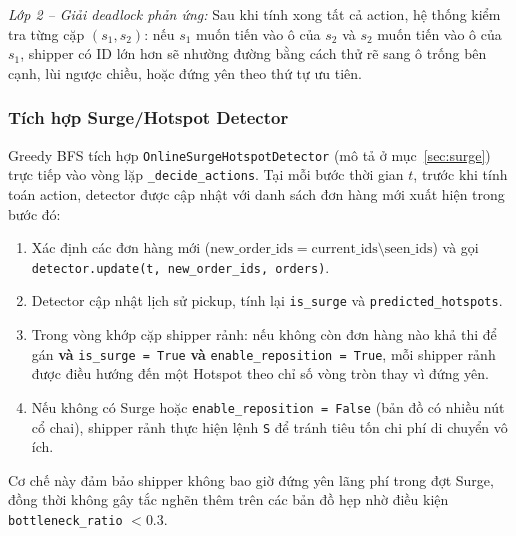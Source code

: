 \documentclass[conference]{IEEEtran}
\begin{document}
\textit{Lớp 2 -- Giải deadlock phản ứng:} Sau khi tính xong tất cả action, hệ thống kiểm tra từng cặp $(s_1, s_2)$: nếu $s_1$ muốn tiến vào ô của $s_2$ và $s_2$ muốn tiến vào ô của $s_1$, shipper có ID lớn hơn sẽ nhường đường bằng cách thử rẽ sang ô trống bên cạnh, lùi ngược chiều, hoặc đứng yên theo thứ tự ưu tiên.

\subsubsection{Tích hợp Surge/Hotspot Detector}
Greedy BFS tích hợp \texttt{OnlineSurgeHotspotDetector} (mô tả ở mục~\ref{sec:surge}) trực tiếp vào vòng lặp \texttt{\_decide\_actions}. Tại mỗi bước thời gian $t$, trước khi tính toán action, detector được cập nhật với danh sách đơn hàng mới xuất hiện trong bước đó:
 
\begin{enumerate}
    \item Xác định các đơn hàng mới ($\text{new\_order\_ids} = \text{current\_ids} \setminus \text{seen\_ids}$) và gọi \texttt{detector.update(t, new\_order\_ids, orders)}.
    \item Detector cập nhật lịch sử pickup, tính lại \texttt{is\_surge} và \texttt{predicted\_hotspots}.
    \item Trong vòng khớp cặp shipper rảnh: nếu không còn đơn hàng nào khả thi để gán \textbf{và} \texttt{is\_surge = True} \textbf{và} \texttt{enable\_reposition = True}, mỗi shipper rảnh được điều hướng đến một Hotspot theo chỉ số vòng tròn thay vì đứng yên.
    \item Nếu không có Surge hoặc \texttt{enable\_reposition = False} (bản đồ có nhiều nút cổ chai), shipper rảnh thực hiện lệnh \texttt{S} để tránh tiêu tốn chi phí di chuyển vô ích.
\end{enumerate}
 
Cơ chế này đảm bảo shipper không bao giờ đứng yên lãng phí trong đợt Surge, đồng thời không gây tắc nghẽn thêm trên các bản đồ hẹp nhờ điều kiện \texttt{bottleneck\_ratio} $< 0.3$.
\end{document}

